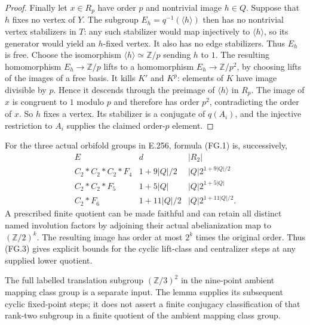 \begin{proof}
Finally let $x\in R_p$ have order $p$ and nontrivial image
$h\in Q$.  Suppose that $h$ fixes no vertex of $Y$.
The subgroup $E_h=q^{-1}(\langle h\rangle)$ then has no nontrivial
vertex stabilizers in $T$: any such stabilizer would map injectively
to $\langle h\rangle$, so its generator would yield an $h$-fixed
vertex.  It also has no edge stabilizers.  Thus $E_h$ is free.
Choose the isomorphism $\langle h\rangle\simeq\mathbb Z/p$ sending
$h$ to $1$.  The resulting homomorphism $E_h\to\mathbb Z/p$ lifts
to a homomorphism $E_h\to\mathbb Z/p^2$, by choosing lifts of the
images of a free basis.  It kills $K'$ and $K^p$: elements of $K$
have image divisible by $p$.  Hence it descends through the
preimage of $\langle h\rangle$ in $R_p$.
The image of $x$ is congruent to $1$ modulo $p$ and therefore has
order $p^2$, contradicting the order of $x$.
So $h$ fixes a vertex.  Its stabilizer is a conjugate of $q(A_i)$,
and the injective restriction to $A_i$ supplies the claimed
order-$p$ element.
\end{proof}

For the three actual orbifold groups in E.256, formula (FG.1)
is, successively,
\[
\begin{array}{c|c|c}
 E&d&|R_2|\\ \hline
 C_2*C_2*C_2*F_4&1+9|Q|/2&|Q|2^{1+9|Q|/2}\\
 C_2*C_2*F_5&1+5|Q|&|Q|2^{1+5|Q|}\\
 C_2*F_6&1+11|Q|/2&|Q|2^{1+11|Q|/2}.
\end{array}                                                   \tag{FG.3}
\]
A prescribed finite quotient can be made faithful and can retain
all distinct named involution factors by adjoining their actual
abelianization map to $(\mathbb Z/2)^k$.  The resulting image has
order at most $2^k$ times the original order.  Thus (FG.3) gives
explicit bounds for the cyclic lift-class and centralizer steps
at any supplied lower quotient.

The full labelled translation subgroup $(\mathbb Z/3)^2$ in the
nine-point ambient mapping class group is a separate input.  The
lemma supplies its subsequent cyclic fixed-point steps; it does
not assert a finite conjugacy classification of that rank-two
subgroup in a finite quotient of the ambient mapping class group.
